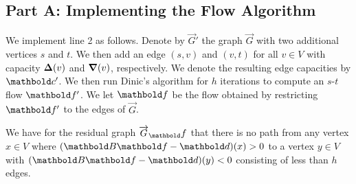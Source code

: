 \documentclass{tufte-handout}
\newcommand{\flowgraph}{\overrightarrow{G}}
\newcommand{\altflowgraph}{\flowgraph'}
\newcommand{\resflowgraph}{\flowgraph_\vf}
\begin{document}
\subsection{Part A: Implementing the Flow Algorithm}
We implement line 2 as follows. Denote by $\altflowgraph$ the graph $\flowgraph$ with two additional vertices $s$ and $t$. We then add an edge $(s,v)$ and $(v,t)$ for all $v \in V$ with capacity $\vDelta(v)$ and $\boldsymbol{\nabla}(v)$, respectively. We denote the resulting edge capacities by $\vc'$. We then run Dinic's algorithm for $h$ iterations to compute an $s$-$t$ flow $\vf'$. We let $\vf$ be the flow obtained by restricting $\vf'$ to the edges of $\flowgraph$.

\begin{lem}\label{lem:1:A:1}
We have for the residual graph $\resflowgraph$ that there is no path from any vertex $x \in V$ where $(\mB\vf - \vd)(x) > 0$ to a vertex $y \in V$ with $(\mB\vf - \vd)(y) < 0$ consisting of less than $h$ edges.
\end{lem}
\end{document}

